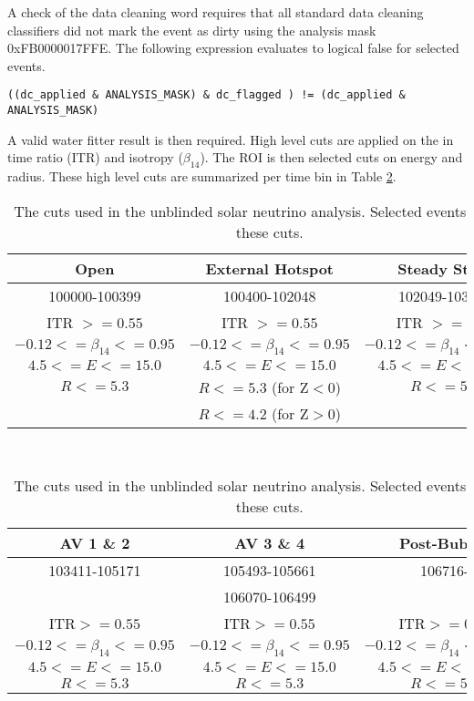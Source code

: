 A check of the data cleaning word requires that all standard data cleaning
classifiers did not mark the event as dirty using the analysis mask 
0xFB0000017FFE.
The following expression evaluates to logical false for selected events.

\begin{verbatim}
((dc_applied & ANALYSIS_MASK) & dc_flagged ) != (dc_applied & ANALYSIS_MASK)
\end{verbatim}

A valid water fitter result is then required.
High level cuts are applied on the in time ratio (ITR) and isotropy ($\beta_{14}$).
The ROI is then selected cuts on energy and radius.
These high level cuts are summarized per time bin in Table \ref{tbl:solar:unblind_roi}.

\begin{table}[]
\begin{center}
\begin{tabular}{c|c|c}
Open & External Hotspot & Steady State  \\ \hline
100000-100399 & 100400-102048 & 102049-103402 \\ \hline
ITR $ >= 0.55$ & ITR $ >= 0.55$ & ITR $ >= 0.55$ \\
$-0.12 <= \beta_{14} <= 0.95$ & $-0.12 <= \beta_{14} <= 0.95$ & $-0.12 <= \beta_{14} <= 0.95$ \\
$4.5 <= E <= 15.0$ & $4.5 <= E <= 15.0$ & $4.5 <= E <= 15.0$ \\
$R <= 5.3$ & $R <= 5.3$ (for Z$<$0) & $R <= 5.3$ \\
 & $R <= 4.2$ (for Z$>$0) & \\
\end{tabular}
\\[2\baselineskip]
\begin{tabular}{c|c|c}
AV 1 \& 2 & AV 3 \& 4 & Post-Bubble \\ \hline
103411-105171 & 105493-105661 & 106716- \\
& 106070-106499 & \\ \hline
ITR$ >= 0.55$ & ITR$ >= 0.55$ & ITR$ >= 0.55$ \\
$-0.12 <= \beta_{14} <= 0.95$ & $-0.12 <= \beta_{14} <= 0.95$ & $-0.12 <= \beta_{14} <= 0.95$ \\
$4.5 <= E <= 15.0$ & $4.5 <= E <= 15.0$ & $4.5 <= E <= 15.0$ \\
$R <= 5.3$ & $R <= 5.3$ & $R <= 5.3$ \\
\end{tabular}
\caption{The cuts used in the unblinded solar neutrino analysis. Selected events will pass these cuts.}
\label{tbl:solar:unblind_roi}
\end{center}
\end{table}

